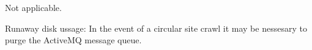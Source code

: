 Not applicable.

Runaway disk ussage\+: In the event of a circular site crawl it may be nessesary to purge the Active\+M\+Q message queue. 